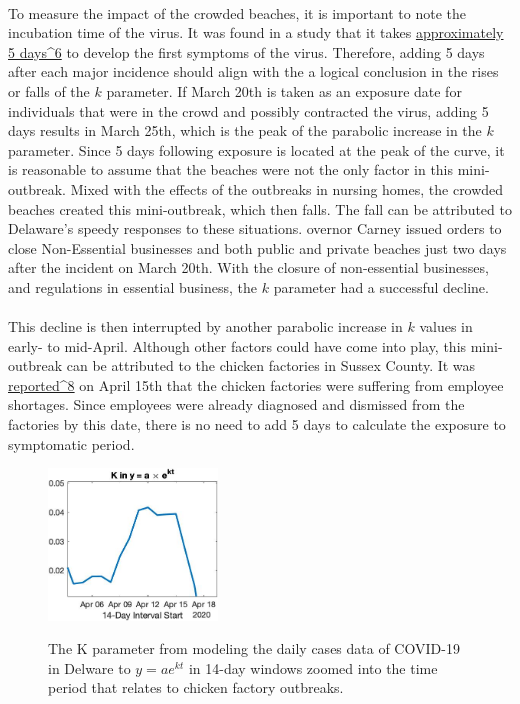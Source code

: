 \documentclass[12pt]{article}
\begin{document}
\paragraph{} To measure the impact of the crowded beaches, it is important to note the incubation time of the virus.  It was found in a study that it takes \href{https://pubmed.ncbi.nlm.nih.gov/32150748/}{approximately 5 days^6} to develop the first symptoms of the virus. Therefore, adding 5 days after each major incidence should align with the a logical conclusion in the rises or falls of the $k$ parameter. If March 20th is taken as an exposure date for individuals that were in the crowd and possibly contracted the virus, adding 5 days results in March 25th, which is the peak of the parabolic increase in the $k$ parameter. Since 5 days following exposure is located at the peak of the curve, it is reasonable to assume that the beaches were not the only factor in this mini-outbreak. Mixed with the effects of the outbreaks in nursing homes, the crowded beaches created this mini-outbreak, which then falls. The fall can be attributed to Delaware's speedy responses to these situations. overnor Carney issued orders to close Non-Essential businesses and both public and private beaches just two days after the incident on March 20th. With the closure of non-essential businesses, and regulations in essential business, the $k$ parameter had a successful decline.

\paragraph{}This decline is then interrupted by another parabolic increase in $k$ values in early- to mid-April. Although other factors could have come into play, this mini-outbreak can be attributed to the chicken factories in Sussex County. It was \href{https://www.foxnews.com/food-drink/delaware-chicken-company-attendance-kill-chickens-coronavirus}{reported^8} on April 15th that the chicken factories were suffering from employee shortages. Since employees were already diagnosed and dismissed from the factories by this date, there is no need to add 5 days to calculate the exposure to symptomatic period.

\begin{figure}[h]
  \centering
  \subfigure
    \includegraphics[width=0.4\textwidth]{Figure6.jpg}%
    \label{fig:a}%
  \caption{The K parameter from modeling the daily cases data of COVID-19 in Delware to $y=ae^{kt}$ in 14-day windows zoomed into the time period that relates to chicken factory outbreaks.}
  \label{fig:6}
\end{figure}
\end{document}
